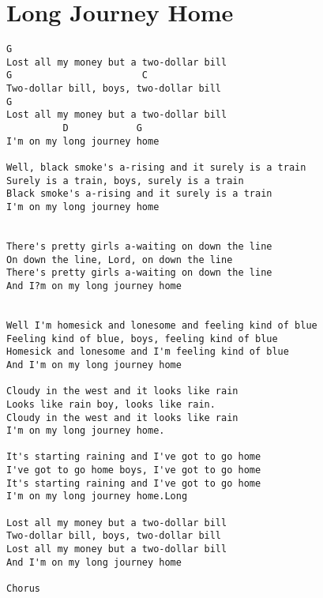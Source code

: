 \documentclass[leqno]{memoir}
\begin{document}


\chapter{Long Journey Home}
\begin{verbatim}
G                       
Lost all my money but a two-dollar bill 
G                       C
Two-dollar bill, boys, two-dollar bill
G
Lost all my money but a two-dollar bill
          D            G
I'm on my long journey home
 
Well, black smoke's a-rising and it surely is a train 
Surely is a train, boys, surely is a train 
Black smoke's a-rising and it surely is a train 
I'm on my long journey home 
 
 
There's pretty girls a-waiting on down the line 
On down the line, Lord, on down the line 
There's pretty girls a-waiting on down the line 
And I?m on my long journey home 
 
 
Well I'm homesick and lonesome and feeling kind of blue 
Feeling kind of blue, boys, feeling kind of blue 
Homesick and lonesome and I'm feeling kind of blue 
And I'm on my long journey home 
 
Cloudy in the west and it looks like rain
Looks like rain boy, looks like rain.
Cloudy in the west and it looks like rain
I'm on my long journey home.

It's starting raining and I've got to go home
I've got to go home boys, I've got to go home
It's starting raining and I've got to go home
I'm on my long journey home.Long
 
Lost all my money but a two-dollar bill 
Two-dollar bill, boys, two-dollar bill 
Lost all my money but a two-dollar bill 
And I'm on my long journey home 
 
Chorus 
     
\end{verbatim}
\newpage
\end{document}
